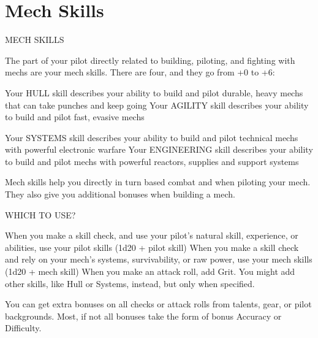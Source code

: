 \chapter{Mech Skills}
                                              MECH SKILLS

The part of your pilot directly related to building, piloting, and fighting with mechs are your mech
skills. There are four, and they go from +0 to +6:

Your HULL skill describes your ability to build and pilot durable, heavy mechs that can take
punches and keep going
Your AGILITY skill describes your ability to build and pilot fast, evasive mechs




Your SYSTEMS skill describes your ability to build and pilot technical mechs with powerful
electronic warfare
Your ENGINEERING skill describes your ability to build and pilot mechs with powerful reactors,
supplies and support systems

Mech skills help you directly in turn based combat and when piloting your mech. They also give
you additional bonuses when building a mech.

                                              WHICH TO USE?

When you make a skill check, and use your pilot’s natural skill, experience, or abilities, use your
pilot skills (1d20 + pilot skill)
When you make a skill check and rely on your mech’s systems, survivability, or raw power, use
your mech skills (1d20 + mech skill)
When you make an attack roll, add Grit. You might add other skills, like Hull or Systems, instead,
but only when specified.

You can get extra bonuses on all checks or attack rolls from talents, gear, or pilot backgrounds.
Most, if not all bonuses take the form of bonus Accuracy or Difficulty.